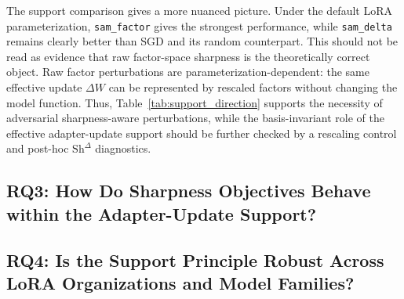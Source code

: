 \documentclass{article}
\begin{document}
The support comparison gives a more nuanced picture.
Under the default LoRA parameterization, \texttt{sam_factor} gives the strongest performance, while \texttt{sam_delta} remains clearly better than SGD and its random counterpart.
This should not be read as evidence that raw factor-space sharpness is the theoretically correct object.
Raw factor perturbations are parameterization-dependent: the same effective update $\Delta W$ can be represented by rescaled factors without changing the model function.
Thus, Table~\ref{tab:support_direction} supports the necessity of adversarial sharpness-aware perturbations, while the basis-invariant role of the effective adapter-update support should be further checked by a rescaling control and post-hoc $\mathrm{Sh}^{\Delta}$ diagnostics.

\subsection{RQ3: How Do Sharpness Objectives Behave within the Adapter-Update Support?}

\subsection{RQ4: Is the Support Principle Robust Across LoRA Organizations and Model Families?}





\end{document}
